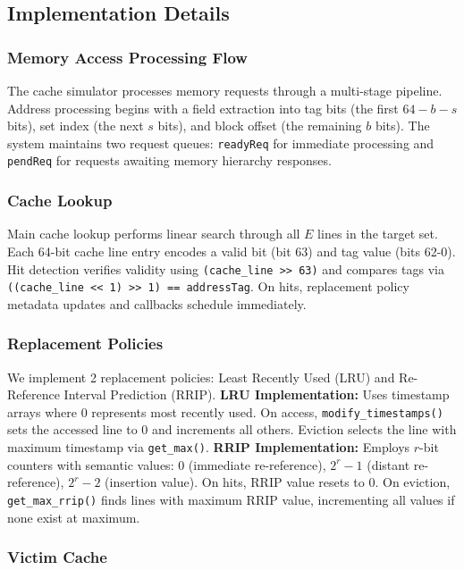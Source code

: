 \documentclass[sigconf,nonacm,natbib=false]{acmart}
\begin{document}
\subsection{Implementation Details}

\subsubsection{Memory Access Processing Flow}

The cache simulator processes memory requests through a multi-stage pipeline. Address processing begins with a field extraction into tag bits (the first $64-b-s$ bits), set index (the next $s$ bits), and block offset (the remaining $b$ bits). The system maintains two request queues: \texttt{readyReq} for immediate processing and \texttt{pendReq} for requests awaiting memory hierarchy responses.

\subsubsection{Cache Lookup}

Main cache lookup performs linear search through all $E$ lines in the target set. Each 64-bit cache line entry encodes a valid bit (bit 63) and tag value (bits 62-0). Hit detection verifies validity using \texttt{(cache\_line >> 63)} and compares tags via \texttt{((cache\_line << 1) >> 1) == addressTag}. On hits, replacement policy metadata updates and callbacks schedule immediately.

\subsubsection{Replacement Policies}

We implement 2 replacement policies: Least Recently Used (LRU) and Re-Reference Interval Prediction (RRIP). \textbf{LRU Implementation:} Uses timestamp arrays where 0 represents most recently used. On access, \texttt{modify\_timestamps()} sets the accessed line to 0 and increments all others. Eviction selects the line with maximum timestamp via \texttt{get\_max()}. \textbf{RRIP Implementation:} Employs $r$-bit counters with semantic values: 0 (immediate re-reference), $2^r-1$ (distant re-reference), $2^r-2$ (insertion value). On hits, RRIP value resets to 0. On eviction, \texttt{get\_max\_rrip()} finds lines with maximum RRIP value, incrementing all values if none exist at maximum.

\subsubsection{Victim Cache}
\end{document}
